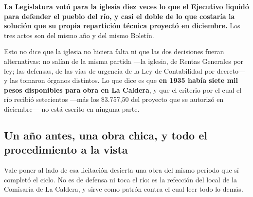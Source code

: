 \textbf{La Legislatura votó para la iglesia diez veces lo que el Ejecutivo liquidó para
defender el pueblo del río, y casi el doble de lo que costaría la solución que su propia
repartición técnica proyectó en diciembre.} Los tres actos son del mismo año y del mismo Boletín.

\begin{cautela}
Esto no dice que la iglesia no hiciera falta ni que las dos decisiones fueran alternativas: no
salían de la misma partida ---la iglesia, de Rentas Generales por ley; las defensas, de
las vías de urgencia de la Ley de Contabilidad por decreto--- y las tomaron órganos distintos. Lo que
dice es que \textbf{en 1935 había siete mil pesos disponibles para obra en La Caldera}, y que
el criterio por el cual el río recibió setecientos ---más los \$3.757,50 del proyecto que se autorizó en diciembre--- no está escrito en ninguna parte.
\end{cautela}

\subsection*{Un año antes, una obra chica, y todo el procedimiento a la vista}

Vale poner al lado de esa licitación desierta una obra del mismo período que sí completó el
ciclo. No es de defensa ni toca el río: es la refección del local de la Comisaría de La
Caldera, y sirve como patrón contra el cual leer todo lo demás.

